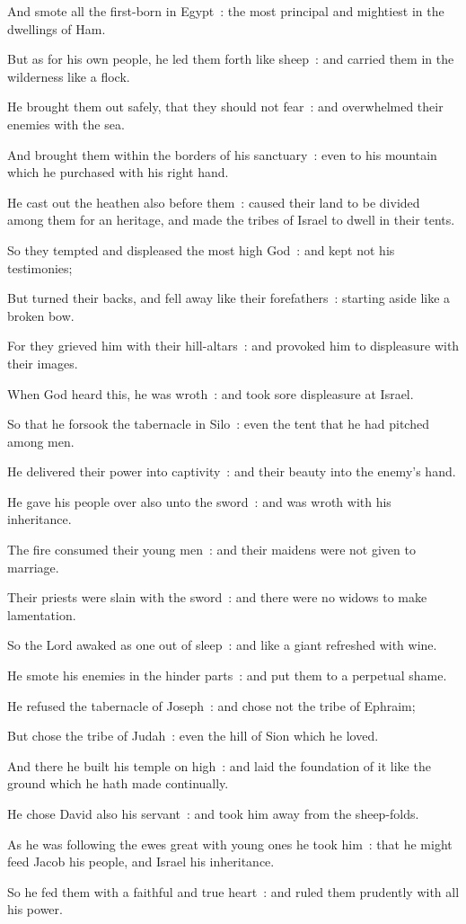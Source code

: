 And smote all the first-born in Egypt~: the most principal and mightiest in the dwellings of Ham.\par
{}But as for his own people, he led them forth like sheep~: and carried them in the wilderness like a flock.\par
{}He brought them out safely, that they should not fear~: and overwhelmed their enemies with the sea.\par
{}And brought them within the borders of his sanctuary~: even to his mountain which he purchased with his right hand.\par
{}He cast out the heathen also before them~: caused their land to be divided among them for an heritage, and made the tribes of Israel to dwell in their tents.\par
{}So they tempted and displeased the most high God~: and kept not his testimonies;\par
{}But turned their backs, and fell away like their forefathers~: starting aside like a broken bow.\par
{}For they grieved him with their hill-altars~: and provoked him to displeasure with their images.\par
{}When God heard this, he was wroth~: and took sore displeasure at Israel.\par
{}So that he forsook the tabernacle in Silo~: even the tent that he had pitched among men.\par
{}He delivered their power into captivity~: and their beauty into the enemy's hand.\par
{}He gave his people over also unto the sword~: and was wroth with his inheritance.\par
{}The fire consumed their young men~: and their maidens were not given to marriage.\par
{}Their priests were slain with the sword~: and there were no widows to make lamentation.\par
{}So the Lord awaked as one out of sleep~: and like a giant refreshed with wine.\par
{}He smote his enemies in the hinder parts~: and put them to a perpetual shame.\par
{}He refused the tabernacle of Joseph~: and chose not the tribe of Ephraim;\par
{}But chose the tribe of Judah~: even the hill of Sion which he loved.\par
{}And there he built his temple on high~: and laid the foundation of it like the ground which he hath made continually.\par
{}He chose David also his servant~: and took him away from the sheep-folds.\par
{}As he was following the ewes great with young ones he took him~: that he might feed Jacob his people, and Israel his inheritance.\par
{}So he fed them with a faithful and true heart~: and ruled them prudently with all his power.\par

